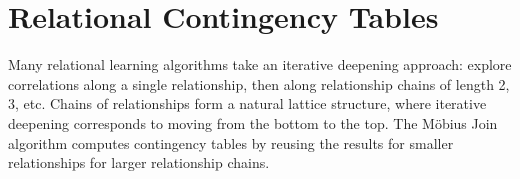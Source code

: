\documentclass{sig-alternate-2013}
\begin{document}
\section{Relational  Contingency Tables}
Many relational learning algorithms take an iterative deepening approach: 
explore correlations along a single relationship, then along relationship chains of length 2, 3, etc. 
Chains of relationships form a natural lattice structure, where iterative deepening corresponds to moving from the bottom to the top. 
%
The M\"obius Join algorithm computes contingency tables by reusing the results for smaller relationships for larger relationship chains. 
%
%
\end{document}
